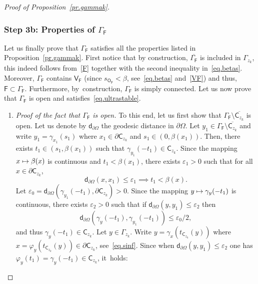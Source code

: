 \documentclass[JEP,XML,SOM,Unicode,NoEqCountersInSection,NoFloatCountersInSection,published]{cedram}
\newcommand\mto{\mathchoice{\longmapsto}{\mapsto}{\mapsto}{\mapsto}}
\let\pa\partial
\let\ve\varepsilon
\theoremstyle{plain}
\theoremstyle{definition}
\begin{document}
\begin{proof}[Proof of Proposition~\ref{pr.gammak}]
\subsubsection*{Step 3b: Properties of $ \Gamma_{\mathsf F}$} Let us finally prove that $ \Gamma_{\mathsf F}$ satisfies all the properties listed in Proposition~\ref{pr.gammak}. First notice that by construction, $\overline{ \Gamma_{\mathsf F}}$ is included in $\Gamma_{z_k}$, this indeed follows from~\eqref{F} together with the second inequality in~\eqref{eq.betas}. Moreover, $ \Gamma_{\mathsf F}$ contains $\mathsf V_{\mathsf F}$ (since $s_{\mathsf O_{\mathsf F}}<\beta$, see~\eqref{eq.betas} and~\eqref{VF}) and thus, $\mathsf F\subset \Gamma_{\mathsf F}$. Furthermore, by~construction, $\Gamma_{\mathsf F}$ is simply connected.
Let us now prove that $ \Gamma_{\mathsf F}$ is open and satisfies~\eqref{eq.ultrastable}.
\begin{enumerate}
\item
\emph{Proof of the fact that $ \Gamma_{\mathsf F}$ is open.} To this end, let us first show that $ \Gamma_{\mathsf F}\setminus \overline{ \mathsf C_{z_k}}$ is open.
Let us denote by $\mathsf d_{\partial \Omega}$ the geodesic distance in $\partial \Omega$. Let $y_1\in \Gamma_{\mathsf F}\setminus \overline{ \mathsf C_{z_k}}$
and write $y_1=\gamma_{x_1}(s_1)$ where $x_1\in \pa \mathsf C_{z_k}$ and $s_1\in (0,\beta(x_1))$.
Then, there exists $t_1\in (s_1, \beta(x_1))$ such that $\gamma_{y_1}(-t_1)\in \mathsf C_{z_k}$.
Since the mapping $x\mto \beta(x)$ is continuous and $t_1<\beta(x_1)$, there exists $\ve_1>0$ such that for all $x\in \pa \mathsf C_{z_k}$,
\begin{equation}\label{eq.fitsve}
\mathsf d_{\partial \Omega}\left(x,x_1\right)\leq \ve_1 \implies t_1<\beta(x).
\end{equation}
Let $\ve_0=\mathsf d_{\partial \Omega}(\gamma_{y_1}(-t_1),\partial \mathsf C_{z_k}) >0$.
Since the mapping $y\mto \gamma_y(-t_1)$ is continuous, there exists $\ve_2>0$ such that if $\mathsf d_{\partial \Omega}\left(y,y_1\right)\leq \ve_2$ then
\[
\mathsf d_{\partial \Omega}(\gamma_y(-t_1),\gamma_{y_1}(-t_1))\leq \ve_0/2,
\]
and thus $\gamma_y(-t_1)\in \mathsf C_{z_k}$.
Let $y\in \Gamma_{z_k}$.
Write $y=\gamma_x(t_{\mathsf C_{z_k}}(y))$ where $x= \varphi_{y}(t_{\mathsf C_{z_k}}(y))\in \pa \mathsf C_{z_k}$, see~\eqref{eq.sinf}. Since when $\mathsf d_{\partial \Omega}\left(y,y_1\right)\leq \ve_2$ one has $\varphi_y(t_1)=\gamma_y(-t_1)\in \mathsf C_{z_k}$, it~holds:
\begin{equation}\label{eq.fitsve2}

\end{equation}
\end{enumerate}
\end{proof}
\end{document}
